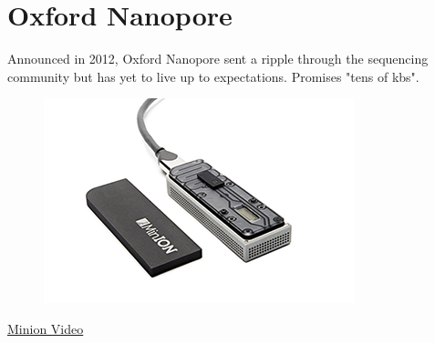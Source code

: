 \documentclass{beamer}
\begin{document}
\section{Oxford Nanopore}
\begin{frame}
Announced in 2012, Oxford Nanopore sent a ripple through the sequencing community but has yet to live up to expectations. Promises "tens of kbs".
  \begin{center}
    \begin{figure}
    \includegraphics[scale=0.4]{mini_ion_300_open-copy.png}
  \end{figure}
  \end{center}
    \begin{center}
  \href{https://player.vimeo.com/video/77246565}{Minion Video}
  \end{center}

\end{frame}
\end{document}
